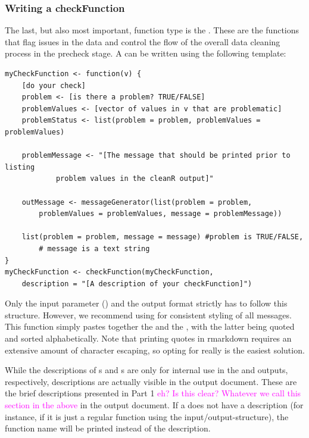 \documentclass[article]{jss}
\newcommand{\hl}[1]{\textcolor{magenta}{#1}}
\begin{document}
\subsubsection{Writing a checkFunction}
The last, but also most important,  function type is the . These are the functions that flag issues in the data and control the flow of the overall data cleaning process in the precheck stage. A  can be written using the following template:
\begin{Verbatim}
myCheckFunction <- function(v) {
	[do your check]
	problem <- [is there a problem? TRUE/FALSE]
	problemValues <- [vector of values in v that are problematic]
	problemStatus <- list(problem = problem, problemValues = problemValues)

	problemMessage <- "[The message that should be printed prior to listing
			problem values in the cleanR output]"

	outMessage <- messageGenerator(list(problem = problem,
		problemValues = problemValues, message = problemMessage))

	list(problem = problem, message = message) #problem is TRUE/FALSE,
		# message is a text string
}
myCheckFunction <- checkFunction(myCheckFunction,
	description = "[A description of your checkFunction]")
\end{Verbatim}
Only the input parameter () and the output format strictly has to follow this structure. However, we recommend using  for consistent styling of all  messages. This function simply pastes together the  and the , with the latter being quoted and sorted alphabetically. Note that printing quotes in rmarkdown requires an extensive amount of character escaping, so opting for  really is the easiest solution.

While the descriptions of s and s are only for internal use in the  and  outputs, respectively,  descriptions are actually visible in the  output document. These are the brief descriptions presented in Part 1 \hl{eh? Is this clear? Whatever we call this section in the above} in the output document. If a  does not have a description (for instance, if it is just a regular function using the  input/output-structure), the function name will be printed instead of the description.
\end{document}
